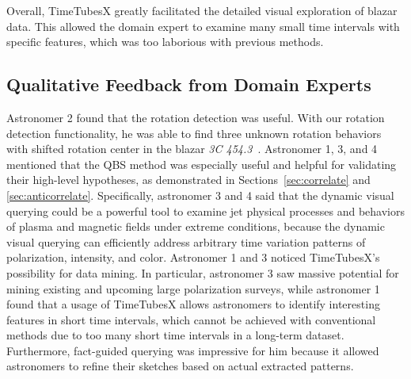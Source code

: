 Overall, TimeTubesX greatly facilitated the detailed visual exploration of blazar data. This allowed the domain expert to examine many small time intervals with specific features, which was too laborious with previous methods.


\subsection{Qualitative Feedback from Domain Experts}\label{sec:feedback}
Astronomer 2 found that the rotation detection was useful. 
With our rotation detection functionality, 
he was able to find three unknown rotation behaviors with shifted rotation center in the blazar \emph{3C 454.3}~\cite{Huang2019}. 
Astronomer 1, 3, and 4 mentioned that the QBS method was especially useful and helpful for validating their high-level hypotheses, as demonstrated in Sections~\ref{sec:correlate} and \ref{sec:anticorrelate}. Specifically, astronomer 3 and 4 said that the dynamic visual querying could be a powerful tool to examine jet physical processes and behaviors of plasma and magnetic fields under extreme conditions, because the dynamic visual querying can efficiently address arbitrary time variation patterns of polarization, intensity, and color. Astronomer 1 and 3 noticed TimeTubesX’s possibility for data mining. In particular, astronomer 3 saw massive potential for mining existing and upcoming large polarization surveys, while astronomer 1 found that a usage of TimeTubesX allows astronomers to identify interesting features in short time intervals, which cannot be achieved with conventional methods due to too many short time intervals in a long-term dataset. Furthermore, fact-guided querying was impressive for him because it allowed astronomers to refine their sketches based on actual extracted patterns.

